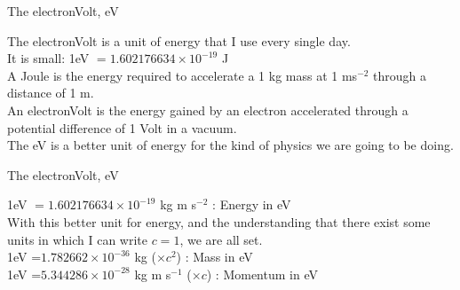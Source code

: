  \begin{frame}{ The electronVolt, eV}
 
 The electronVolt is a unit of energy that I use every single day.\\[2ex]
 
 
 It is small: 1eV $=1.602176634\times10^{-19}$ J \\[2ex]
 
 A Joule is the energy required to accelerate a 1 kg mass at 1 ms$^{-2}$ through a distance of 1 m.\\[2ex]
 
 An electronVolt is the energy gained by an electron accelerated through a potential difference of 1 Volt in a vacuum.\\[2ex]
 
 
 
 The eV is a better unit of energy for the kind of physics we are going to be doing.
 
 
 

 \end{frame}
 
 
\begin{frame}{ The electronVolt, eV}
 
1eV $=1.602176634\times10^{-19}$ kg m s$^{-2}$ : Energy in eV \\[2ex]

With this better unit for energy, and the understanding that there exist some units in which I can write $c=1$, we are all set.\\[2ex]

1eV =$1.782662\times10^{-36}$ kg ($\times c^{2}$) : Mass in eV \\[2ex]

1eV =$5.344286\times10^{-28}$ kg m s$^{-1}$ ($\times c$) : Momentum in eV\\[2ex]
 
\end{frame}


